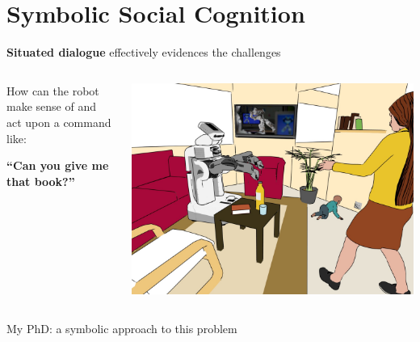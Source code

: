 \documentclass[compress]{beamer}
\begin{document}

\section*{Symbolic Social Cognition}




\begin{frame}[plain]

    \centering
    {\bf Situated dialogue} effectively evidences the challenges

    \begin{columns}
        \begin{column}{0.5\linewidth}
            How can the robot make sense of and act upon a command like:
            \vspace{2em}

            \bf
            ``Can you give me that book?''
        \end{column}
        \begin{column}{0.5\linewidth}
            \begin{center}
                \includegraphics[width=\linewidth]{pr2-baby-3}
            \end{center}
        \end{column}
    \end{columns}

    \pause

    \vspace{2em}
    My PhD: a symbolic approach to this problem
\end{frame}
\end{document}
